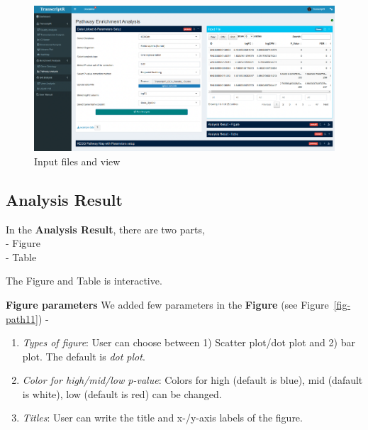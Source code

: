 \documentclass[
  a4paper,
  oneside,
  open=any]{scrreport}
\begin{document}
\begin{figure}[H]

{\centering \includegraphics{./_images/pathway/path1.png}

}

\caption{\label{fig-path1}Input files and view}

\end{figure}

\hypertarget{analysis-result-4}{%
\subsection{Analysis Result}\label{analysis-result-4}}

In the \textbf{Analysis Result}, there are two parts,\\
- Figure\\
- Table

The Figure and Table is interactive.

\textbf{Figure parameters} We added few parameters in the
\textbf{Figure} (see Figure~\ref{fig-path11}) -

\begin{enumerate}
\def\labelenumi{\arabic{enumi}.}
\item
  \emph{Types of figure}: User can choose between 1) Scatter plot/dot
  plot and 2) bar plot. The default is \emph{dot plot}.
\item
  \emph{Color for high/mid/low p-value}: Colors for high (default is
  blue), mid (dafault is white), low (default is red) can be changed.
\item
  \emph{Titles}: User can write the title and x-/y-axis labels of the
  figure.
\end{enumerate}
\end{document}
